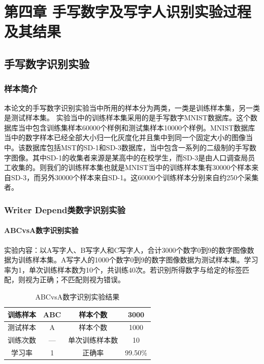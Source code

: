 \chapter{第四章	手写数字及写字人识别实验过程及其结果}
\section{手写数字识别实验}
\subsection{样本简介}

本论文的手写数字识别实验当中所用的样本分为两类，一类是训练样本集，另一类是测试样本集。
实验当中的训练样本集采用的是手写数字MNIST数据库。这个数据库当中包含训练集样本60000个样例和测试集样本10000个样例。MNIST数据库当中的数字样本已经全部大小归一化灰度化并且集中到同一个固定大小的图像当中。该数据库包括MST的SD-1和SD-3数据库，当中包含一系列的二级制的手写数字图像。其中SD-1的收集者来源是某高中的在校学生，而SD-3是由人口调查局员工收集的。则我们的训练样本集也就是MNIST当中的训练样本集有30000个样本来自SD-3，而另外30000个样本来自SD-1。这60000个训练样本分别来自约250个采集者。
\subsection{Writer Depend类数字识别实验}
\subsubsection{ABCvsA数字识别实验}
实验内容：以A写字人、B写字人和C写字人，合计3000个数字0到9的数字图像数据为训练样本集。A写字人的1000个数字0到9的数字图像数据为测试样本集。学习率为1，单次训练样本数为10个，共训练40次。若识别所得数字与给定的标签匹配，则视为正确；不匹配则视为错误。
\begin{table}[htbp]
    \centering
    \caption{ABCvsA数字识别实验结果}
    \label{tab:1}
    \begin{tabular}{@{}cccc@{}}
        \toprule
        训练样本 & ABC & 样本个数    & 3000    \\ \midrule
        测试样本 & A   & 样本个数    & 1000    \\
        训练次数 & —   & 单次训练样本数 & 10      \\
        学习率  & 1   & 正确率     & 99.50\% \\ \bottomrule
    \end{tabular}
\end{table}


